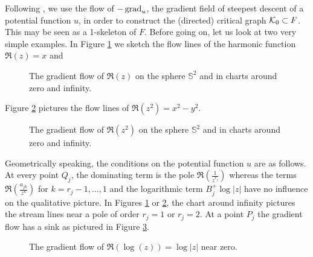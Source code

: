 Following \cite[Section 3.2]{Boedigheimer19901}, we use the flow of $-\operatorname{grad}_u$, the gradient field of steepest descent of a potential function $u$,
in order to construct the (directed) critical graph $\mathcal{K}_0 \subset F$.
This may be seen as a 1-skeleton of $F$.
Before going on, let us look at two very simple examples.
In Figure \ref{cellular_models:from_moduli_spaces_to_parallel_slit_domains:re_z} we sketch the flow lines of the harmonic function $\Re(z) = x$ and 
\begin{figure}[ht]
    \centering
    \def\svgwidth{.3\columnwidth}
    
    \hfill
    \def\svgwidth{.3\columnwidth}
    
    \hfill
    \def\svgwidth{.3\columnwidth}
    
    \caption{\label{cellular_models:from_moduli_spaces_to_parallel_slit_domains:re_z}The gradient flow of $\Re(z)$ on the sphere $\mathbb S^2$ and in charts around zero and infinity.}
\end{figure}
Figure \ref{cellular_models:from_moduli_spaces_to_parallel_slit_domains:re_z_squared} pictures the flow lines of $\Re(z^2) = x^2 - y^2$.
\begin{figure}[ht]
    \centering
    \def\svgwidth{.3\columnwidth}
    
    \hfill
    \def\svgwidth{.3\columnwidth}
    
    \hfill
    \def\svgwidth{.3\columnwidth}
    
    \caption{\label{cellular_models:from_moduli_spaces_to_parallel_slit_domains:re_z_squared}The gradient flow of $\Re(z^2)$ on the sphere $\mathbb S^2$ and in charts around zero and infinity.}
\end{figure}
Geometrically speaking, the conditions on the potential function $u$ are as follows.
At every point $Q_j$, the dominating term is the pole $\Re(\frac{1}{z^{r_j}})$ whereas
the terms $\Re ( \frac{a_{jk}}{z^k} )$ for $k = r_j - 1, \ldots, 1$ and the logarithmic term $B^+_j\log|z|$ have no influence on the qualitative picture.
In Figures \ref{cellular_models:from_moduli_spaces_to_parallel_slit_domains:re_z} or \ref{cellular_models:from_moduli_spaces_to_parallel_slit_domains:re_z_squared},
the chart around infinity pictures the stream lines near a pole of order $r_j = 1$ or $r_j = 2$.
At a point $P_j$ the gradient flow has a sink as pictured in Figure \ref{cellular_models:from_moduli_spaces_to_parallel_slit_domains:re_log_z}.
\begin{figure}[ht]
    \centering
    \def\svgwidth{.3\columnwidth}
    
    \caption{\label{cellular_models:from_moduli_spaces_to_parallel_slit_domains:re_log_z}The gradient flow of $\Re(\log(z)) = \log|z|$ near zero.}
\end{figure}
